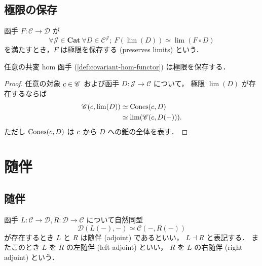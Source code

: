 \documentclass[titlepage]{ltjsreport}
\newcommand{\cat}[1]{\mathscr{#1}}
\newcommand{\obj}[1]{\lowercase{#1}}
\newcommand{\objs}[1]{#1}
\newcommand{\mrp}[3]{{#1}:{#2}\to{#3}}
\newcommand{\mrps}[3]{#1(#2,#3)}
\newcommand{\Cat}{\mathbf{Cat}}
\newcommand{\Fun}[2]{{#2}^{#1}}
\begin{document}
\section{極限の保存}

\begin{definition}[極限の保存]
  \def\C{\cat{C}}%
  \def\D{\cat{D}}%
  \def\f{F}%
  \def\J{\cat{J}}%
  \def\diagram{D}%
  函手 $\mrp{\f}{\C}{\D}$ が
  \begin{equation}
    \forall\J\in\objs{\Cat}\ \forall\diagram\in\Fun{\J}{\C};
    \ \f(\lim(\diagram))\simeq\lim(\f\circ\diagram)
  \end{equation}
  を満たすとき，$\f$ は極限を保存する (preserves limits) という．
\end{definition}

\begin{theorem}\label{thm:hom-functor-preserves-limits}
  任意の共変 hom 函手 (\cref{def:covariant-hom-functor}) は極限を保存する．
\end{theorem}
\begin{proof}
  \def\C{\cat{C}}%
  \def\c{\obj{c}}%
  \def\f{F}%
  \def\J{\cat{J}}%
  \def\diagram{D}%
  任意の対象 $\c\in\objs{\C}$ および函手 $\mrp{\diagram}{\J}{\C}$ について，
  極限 $\lim(\diagram)$ が存在するならば
  \begin{align}
    \mrps{\C}{\c}{\lim(\diagram)}
     & \simeq\operatorname{Cones}(\c,\diagram) \\
     & \simeq\lim(\mrps{\C}{\c}{\diagram(-)}).
  \end{align}
  ただし $\operatorname{Cones}(\c,\diagram)$ は
  $\c$ から $\diagram$ への錐の全体を表す．
\end{proof}

\chapter{随伴}

\section{随伴}

\begin{definition}[随伴]
  \def\C{\cat{C}}%
  \def\D{\cat{D}}%
  \def\L{L}%
  \def\R{R}%
  函手 $\mrp{\L}{\C}{\D},\mrp{\R}{\D}{\C}$ について自然同型
  \begin{equation}
    \mrps{\D}{\L(-)}{-}\simeq\mrps{\C}{-}{\R(-)}
  \end{equation}
  が存在するとき $\L$ と $\R$ は随伴 (adjoint) であるといい，
  $\L\dashv\R$ と表記する．
  またこのとき $\L$ を $\R$ の左随伴 (left adjoint) といい，
  $\R$ を $\L$ の右随伴 (right adjoint) という．
\end{definition}
\end{document}
